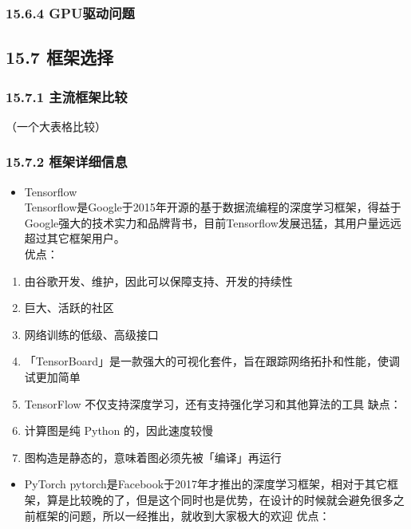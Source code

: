 \subsubsection{15.6.4 GPU驱动问题}\label{gpuux9a71ux52a8ux95eeux9898}

\subsection{15.7 框架选择}\label{ux6846ux67b6ux9009ux62e9}

\subsubsection{15.7.1
主流框架比较}\label{ux4e3bux6d41ux6846ux67b6ux6bd4ux8f83}

（一个大表格比较）

\subsubsection{15.7.2
框架详细信息}\label{ux6846ux67b6ux8be6ux7ec6ux4fe1ux606f}

\begin{itemize}
\item
  Tensorflow\\
  Tensorflow是Google于2015年开源的基于数据流编程的深度学习框架，得益于Google强大的技术实力和品牌背书，目前Tensorflow发展迅猛，其用户量远远超过其它框架用户。\\
  优点：\\
\end{itemize}

\begin{enumerate}
\def\labelenumi{\arabic{enumi}.}
\item
  由谷歌开发、维护，因此可以保障支持、开发的持续性
\item
  巨大、活跃的社区
\item
  网络训练的低级、高级接口
\item
  「TensorBoard」是一款强大的可视化套件，旨在跟踪网络拓扑和性能，使调试更加简单
\item
  TensorFlow 不仅支持深度学习，还有支持强化学习和其他算法的工具 缺点：\\
\item
  计算图是纯 Python 的，因此速度较慢
\item
  图构造是静态的，意味着图必须先被「编译」再运行
\end{enumerate}

\begin{itemize}
\item
  PyTorch
  pytorch是Facebook于2017年才推出的深度学习框架，相对于其它框架，算是比较晚的了，但是这个同时也是优势，在设计的时候就会避免很多之前框架的问题，所以一经推出，就收到大家极大的欢迎
  优点：\\
\end{itemize}

